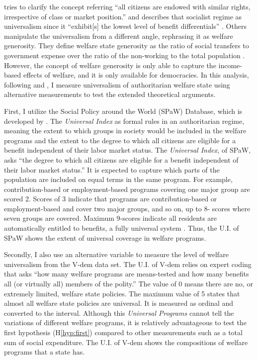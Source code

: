 \documentclass[11pt]{article}
\begin{document}
\citet[25]{Gosta1990} tries to clarify the concept referring ``all citizens are endowed with similar rights, irrespective of class or market position.'' and describes that socialist regime as universalism since it ``exhibit[s] the lowest level of benefit differentials'' \citep[69]{Gosta1990}. Others manipulate the universalism from a different angle, rephrasing it as welfare generosity. They define welfare state generosity as the ratio of social transfers to government expense over the ratio of the non-working to the total population \citep{Iversen2000,Rueda2008,Yi2014}. However, the concept of welfare generosity is only able to capture the income-based effects of welfare, and it is only available for democracies. In this analysis, following \citet{Knutsen2018} and \citet{Rasmussen2019}, I measure universalism of authoritarian welfare state using alternative measurements to test the extended theoretical arguments.

First, I utilize the Social Policy around the World (SPaW) Database, which is developed by \citet{Rasmussen2016}. The \textit{Universal Index} as formal rules in an authoritarian regime, meaning the extent to which groups in society would be included in the welfare programs and the extent to the degree to which all citizens are eligible for a benefit independent of their labor market status. The \textit{Universal Index,} of SPaW, asks ``the degree to which all citizens are eligible for a benefit independent of their labor market status.'' It is expected to capture which parts of the population are included on equal terms in the same program. For example, contribution-based or employment-based programs covering one major group are scored 2. Scores of 3 indicate that programs are contribution-based or employment-based and cover two major groups, and so on, up to 8- scores where seven groups are covered. Maximum 9-scores indicate all residents are automatically entitled to benefits, a fully universal system \citep{Rasmussen2016,Rasmussen2019}. Thus, the U.I. of SPaW shows the extent of universal coverage in welfare programs.

Secondly, I also use an alternative variable to measure the level of welfare universalism from the V-dem data set. The U.I. of V-dem relies on expert coding that asks ``how many welfare programs are means-tested and how many benefits all (or virtually all) members of the polity.'' The value of 0 means there are no, or extremely limited, welfare state policies. The maximum value of 5 states that almost all welfare state policies are universal. It is measured as ordinal and converted to the interval. Although this \textit{Universal Programs} cannot tell the variations of different welfare programs, it is relatively advantageous to test the first hypothesis (H\ref{hyp:first}) compared to other measurements such as a total sum of social expenditure. The U.I. of V-dem shows the compositions of welfare programs  that a state has.
\end{document}

